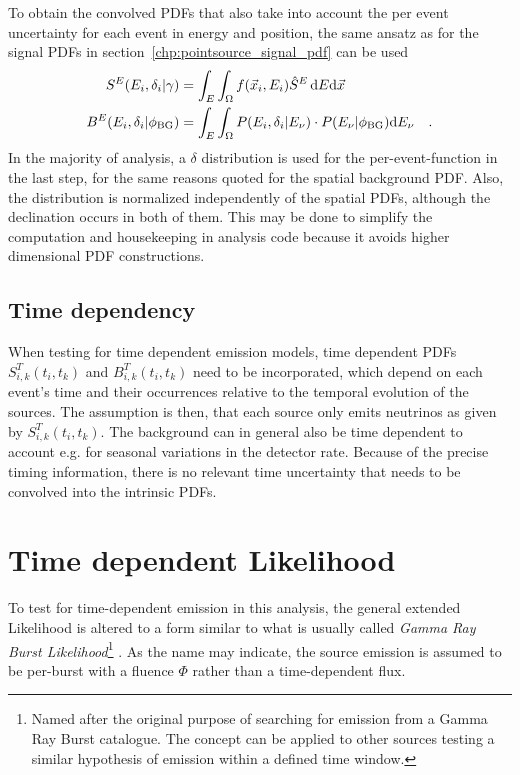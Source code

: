 To obtain the convolved PDFs that also take into account the per event uncertainty for each event in energy and position, the same ansatz as for the signal PDFs in section~\ref{chp:pointsource_signal_pdf} can be used
\begin{align}
  S^E(E_i, \delta_i|\gamma) &=
    \int_E\int_\Omega f(\vec{x}_i, E_i)\hat{S}^E\,\mathrm{d}E\mathrm{d}\vec{x} \\
  B^E(E_i, \delta_i|\phi_\mathrm{BG}) &=
    \int_E\int_\Omega P(E_i,\delta_i|E_\nu)\cdot P(E_\nu|\phi_\mathrm{BG})
      \mathrm{d}E_\nu
    \quad\text{.}
\end{align}
In the majority of analysis, a $\delta$ distribution is used for the per-event-function in the last step, for the same reasons quoted for the spatial background PDF.
Also, the distribution is normalized independently of the spatial PDFs, although the declination occurs in both of them.
This may be done to simplify the computation and housekeeping in analysis code because it avoids higher dimensional PDF constructions.

\subsection{Time dependency}
When testing for time dependent emission models, time dependent PDFs $S_{i,k}^T(t_i, t_k)$ and $B_{i,k}^T(t_i, t_k)$ need to be incorporated, which depend on each event's time and their occurrences relative to the temporal evolution of the sources.
The assumption is then, that each source only emits neutrinos as given by $S_{i,k}^T(t_i, t_k)$.
The background can in general also be time dependent to account e.g. for seasonal variations in the detector rate.
Because of the precise timing information, there is no relevant time uncertainty that needs to be convolved into the intrinsic PDFs.


\section{Time dependent Likelihood}
  \label{chp:pointsource_tdep_llh}
To test for time-dependent emission in this analysis, the general extended Likelihood is altered to a form similar to what is usually called \emph{Gamma Ray Burst Likelihood}\footnote{Named after the original purpose of searching for emission from a Gamma Ray Burst catalogue. The concept can be applied to other sources testing a similar hypothesis of emission within a defined time window.} .
As the name may indicate, the source emission is assumed to be per-burst with a fluence $\Phi$ rather than a time-dependent flux.

